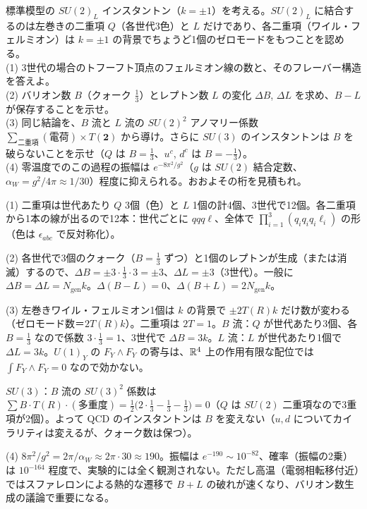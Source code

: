 \begin{problem}[難易度 B]\label{ch09-prob-bl}
標準模型の $SU(2)_L$ インスタントン（$k=\pm1$）を考える。$SU(2)_L$ に結合するのは左巻きの二重項 $Q$（各世代3色）と $L$ だけであり、各二重項（ワイル・フェルミオン）は $k=\pm1$ の背景でちょうど1個のゼロモードをもつことを認める。\\
(1) 3世代の場合のトフーフト頂点のフェルミオン線の数と、そのフレーバー構造を答えよ。\\
(2) バリオン数 $B$（クォーク $\frac13$）とレプトン数 $L$ の変化 $\Delta B$, $\Delta L$ を求め、$B-L$ が保存することを示せ。\\
(3) 同じ結論を、$B$ 流と $L$ 流の $SU(2)^2$ アノマリー係数 $\sum_{\text{二重項}}(\text{電荷})\times T(\mathbf 2)$ から導け。さらに $SU(3)$ のインスタントンは $B$ を破らないことを示せ（$Q$ は $B=\frac13$、$u^c$, $d^c$ は $B=-\frac13$）。\\
(4) 零温度でのこの過程の振幅は $e^{-8\pi^2/g^2}$（$g$ は $SU(2)$ 結合定数、$\alpha_W=g^2/4\pi\approx1/30$）程度に抑えられる。おおよその桁を見積もれ。
\end{problem}

\begin{solution}
(1) 二重項は世代あたり $Q$ 3個（色）と $L$ 1個の計4個、3世代で12個。各二重項から1本の線が出るので12本：世代ごとに $qqq\ell$、全体で $\prod_{i=1}^3(q_iq_iq_i\ell_i)$ の形（色は $\epsilon_{abc}$ で反対称化）。

(2) 各世代で3個のクォーク（$B=\frac13$ ずつ）と1個のレプトンが生成（または消滅）するので、$\Delta B=\pm3\cdot\frac13\cdot3=\pm3$、$\Delta L=\pm3$（3世代）。一般に $\Delta B=\Delta L=N_{\mathrm{gen}}k$。$\Delta(B-L)=0$、$\Delta(B+L)=2N_{\mathrm{gen}}k$。

(3) 左巻きワイル・フェルミオン1個は $k$ の背景で $\pm2T(R)k$ だけ数が変わる（ゼロモード数＝$2T(R)k$）。二重項は $2T=1$。$B$ 流：$Q$ が世代あたり3個、各 $B=\frac13$ なので係数 $3\cdot\frac13=1$、3世代で $\Delta B=3k$。$L$ 流：$L$ が世代あたり1個で $\Delta L=3k$。$U(1)_Y$ の $F_Y\wedge F_Y$ の寄与は、$\mathbb{R}^4$ 上の作用有限な配位では $\int F_Y\wedge F_Y=0$ なので効かない。

$SU(3)$：$B$ 流の $SU(3)^2$ 係数は $\sum B\cdot T(R)\cdot(\text{多重度})=\frac12\bigl(2\cdot\frac13-\frac13-\frac13\bigr)=0$（$Q$ は $SU(2)$ 二重項なので3重項が2個）。よって QCD のインスタントンは $B$ を変えない（$u,d$ についてカイラリティは変えるが、クォーク数は保つ）。

(4) $8\pi^2/g^2=2\pi/\alpha_W\approx2\pi\cdot30\approx190$。振幅は $e^{-190}\sim10^{-82}$、確率（振幅の2乗）は $10^{-164}$ 程度で、実験的には全く観測されない。ただし高温（電弱相転移付近）ではスファレロンによる熱的な遷移で $B+L$ の破れが速くなり、バリオン数生成の議論で重要になる。
\end{solution}

